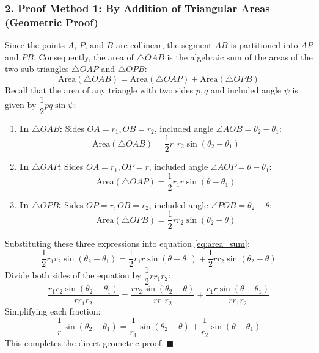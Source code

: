 \documentclass[11pt,a4paper]{article}
\begin{document}
\subsubsection*{2. Proof Method 1: By Addition of Triangular Areas (Geometric Proof)}
Since the points $A$, $P$, and $B$ are collinear, the segment $AB$ is partitioned into $AP$ and $PB$.
Consequently, the area of $\triangle OAB$ is the algebraic sum of the areas of the two sub-triangles $\triangle OAP$ and $\triangle OPB$:
\begin{equation}\label{eq:area_sum}
\text{Area}(\triangle OAB) = \text{Area}(\triangle OAP) + \text{Area}(\triangle OPB)
\end{equation}
Recall that the area of any triangle with two sides $p, q$ and included angle $\psi$ is given by $\dfrac{1}{2}pq\sin\psi$:
\begin{enumerate}\setlength{\itemsep}{1.5pt}
    \item \textbf{In $\triangle OAB$:} Sides $OA = r_1, OB = r_2$, included angle $\angle AOB = \theta_2 - \theta_1$:
    \[
    \text{Area}(\triangle OAB) = \frac{1}{2} r_1 r_2 \sin(\theta_2 - \theta_1)
    \]
    \item \textbf{In $\triangle OAP$:} Sides $OA = r_1, OP = r$, included angle $\angle AOP = \theta - \theta_1$:
    \[
    \text{Area}(\triangle OAP) = \frac{1}{2} r_1 r \sin(\theta - \theta_1)
    \]
    \item \textbf{In $\triangle OPB$:} Sides $OP = r, OB = r_2$, included angle $\angle POB = \theta_2 - \theta$:
    \[
    \text{Area}(\triangle OPB) = \frac{1}{2} r r_2 \sin(\theta_2 - \theta)
    \]
\end{enumerate}
Substituting these three expressions into equation \eqref{eq:area_sum}:
\[
\frac{1}{2} r_1 r_2 \sin(\theta_2 - \theta_1) = \frac{1}{2} r_1 r \sin(\theta - \theta_1) + \frac{1}{2} r r_2 \sin(\theta_2 - \theta)
\]
Divide both sides of the equation by $\dfrac{1}{2} r r_1 r_2$:
\[
\frac{r_1 r_2 \sin(\theta_2 - \theta_1)}{r r_1 r_2} = \frac{r r_2 \sin(\theta_2 - \theta)}{r r_1 r_2} + \frac{r_1 r \sin(\theta - \theta_1)}{r r_1 r_2}
\]
Simplifying each fraction:
\begin{equation}\label{eq:result_std}
\frac{1}{r}\sin(\theta_2 - \theta_1) = \frac{1}{r_1}\sin(\theta_2 - \theta) + \frac{1}{r_2}\sin(\theta - \theta_1)
\end{equation}
This completes the direct geometric proof. \hfill $\blacksquare$

\clearpage
\end{document}
